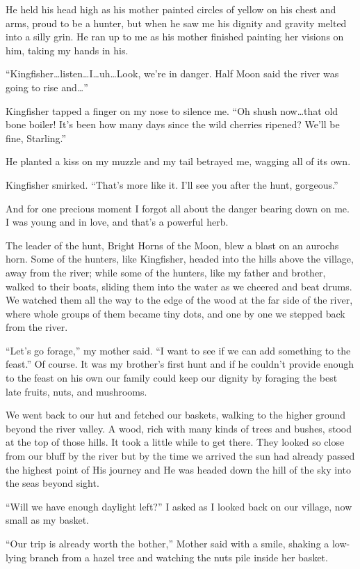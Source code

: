 He held his head high as his mother painted circles of yellow on his chest and arms, proud to be a hunter, but when he saw me his dignity and gravity melted into a silly grin. He ran up to me as his mother finished painting her visions on him, taking my hands in his.

``Kingfisher\ldots{}listen\ldots{}I\ldots{}uh\ldots{}Look, we're in danger. Half Moon said the river was going to rise and\ldots''

Kingfisher tapped a finger on my nose to silence me. ``Oh shush now\ldots{}that old bone boiler! It's been how many days since the wild cherries ripened? We'll be fine, Starling.''

He planted a kiss on my muzzle and my tail betrayed me, wagging all of its own.

Kingfisher smirked. ``That's more like it. I'll see you after the hunt, gorgeous.''

And for one precious moment I forgot all about the danger bearing down on me. I was young and in love, and that's a powerful herb.

The leader of the hunt, Bright Horns of the Moon, blew a blast on an aurochs horn. Some of the hunters, like Kingfisher, headed into the hills above the village, away from the river; while some of the hunters, like my father and brother, walked to their boats, sliding them into the water as we cheered and beat drums. We watched them all the way to the edge of the wood at the far side of the river, where whole groups of them became tiny dots, and one by one we stepped back from the river.

``Let's go forage,'' my mother said. ``I want to see if we can add something to the feast.'' Of course. It was my brother's first hunt and if he couldn't provide enough to the feast on his own our family could keep our dignity by foraging the best late fruits, nuts, and mushrooms.

We went back to our hut and fetched our baskets, walking to the higher ground beyond the river valley. A wood, rich with many kinds of trees and bushes, stood at the top of those hills. It took a little while to get there. They looked so close from our bluff by the river but by the time we arrived the sun had already passed the highest point of His journey and He was headed down the hill of the sky into the seas beyond sight.

``Will we have enough daylight left?'' I asked as I looked back on our village, now small as my basket.

``Our trip is already worth the bother,'' Mother said with a smile, shaking a low-lying branch from a hazel tree and watching the nuts pile inside her basket.

